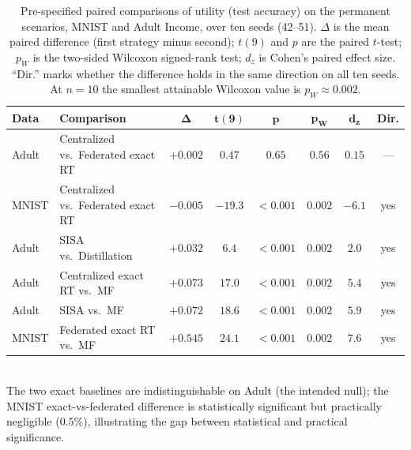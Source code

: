 \begin{table}[H]
\centering
\caption{Pre-specified paired comparisons of utility (test accuracy) on the permanent
scenarios, MNIST and Adult Income, over ten seeds (42--51). $\Delta$ is the mean paired
difference (first strategy minus second); $t(9)$ and $p$ are the paired $t$-test; $p_W$ is the
two-sided Wilcoxon signed-rank test; $d_z$ is Cohen's paired effect size. ``Dir.'' marks whether
the difference holds in the same direction on all ten seeds. At $n{=}10$ the smallest attainable
Wilcoxon value is $p_W \approx 0.002$.}
\label{tab:significance}
\small
\renewcommand{\arraystretch}{1.2}
\begin{tabular}{@{} l l c c c c c c @{}}
\toprule
\textbf{Data} & \textbf{Comparison} & $\boldsymbol{\Delta}$ & $\boldsymbol{t(9)}$ & $\boldsymbol{p}$ & $\boldsymbol{p_W}$ & $\boldsymbol{d_z}$ & \textbf{Dir.} \\
\midrule
Adult & Centralized vs.\ Federated exact RT & $+0.002$ & $0.47$ & $0.65$ & $0.56$ & $0.15$ & --- \\
MNIST & Centralized vs.\ Federated exact RT & $-0.005$ & $-19.3$ & $<0.001$ & $0.002$ & $-6.1$ & yes \\
Adult & SISA vs.\ Distillation & $+0.032$ & $6.4$ & $<0.001$ & $0.002$ & $2.0$ & yes \\
Adult & Centralized exact RT vs.\ MF & $+0.073$ & $17.0$ & $<0.001$ & $0.002$ & $5.4$ & yes \\
Adult & SISA vs.\ MF & $+0.072$ & $18.6$ & $<0.001$ & $0.002$ & $5.9$ & yes \\
MNIST & Federated exact RT vs.\ MF & $+0.545$ & $24.1$ & $<0.001$ & $0.002$ & $7.6$ & yes \\
\bottomrule
\end{tabular}
\\[3pt]
{\footnotesize The two exact baselines are indistinguishable on Adult (the intended null);
the MNIST exact-vs-federated difference is statistically significant but practically negligible
($0.5\%$), illustrating the gap between statistical and practical significance.}
\end{table}

